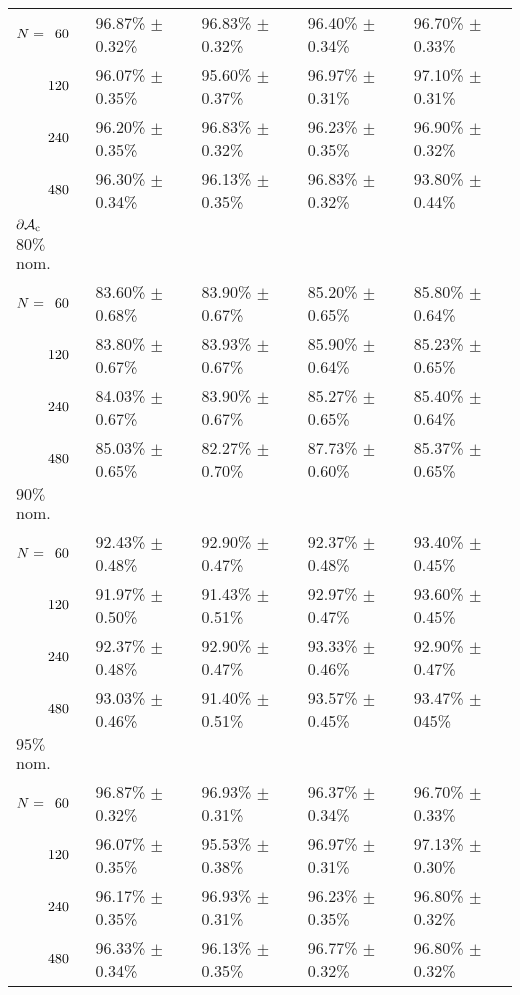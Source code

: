 \begin{table}[htbp]
\begin{tabular}{@{}p{}*{4}{L{\tabcolsep\relax}}@{}}
$N = \hphantom{1}60$ & 96.87\% $\pm$ 0.32\% & 96.83\% $\pm$ 0.32\% & 96.40\% $\pm$ 0.34\% & 96.70\% $\pm$ 0.33\% \\[-0.4em]
$\hphantom{N{}={}}120$ & 96.07\% $\pm$ 0.35\% & 95.60\% $\pm$ 0.37\% & 96.97\% $\pm$ 0.31\% & 97.10\% $\pm$ 0.31\% \\[-0.4em]
$\hphantom{N{}={}}240$ & 96.20\% $\pm$ 0.35\% & 96.83\% $\pm$ 0.32\% & 96.23\% $\pm$ 0.35\% & 96.90\% $\pm$ 0.32\% \\[-0.4em]
$\hphantom{N{}={}}480$ & 96.30\% $\pm$ 0.34\% & 96.13\% $\pm$ 0.35\% & 96.83\% $\pm$ 0.32\% & 93.80\% $\pm$ 0.44\%\\
\midrule
$\mathbf{\operatorname{\partial\mathcal{A}_{c}}}$\\[-0.4em]
$80\%$ nom.\\[-0.4em]
$N = \hphantom{1}60$ & 83.60\% $\pm$ 0.68\% & 83.90\% $\pm$ 0.67\% & 85.20\% $\pm$ 0.65\% & 85.80\% $\pm$ 0.64\% \\[-0.4em]
$\hphantom{N{}={}}120$ & 83.80\% $\pm$ 0.67\% & 83.93\% $\pm$ 0.67\% & 85.90\% $\pm$ 0.64\% & 85.23\% $\pm$ 0.65\%\\[-0.4em]
$\hphantom{N{}={}}240$ & 84.03\% $\pm$ 0.67\% & 83.90\% $\pm$ 0.67\% & 85.27\% $\pm$ 0.65\% & 85.40\% $\pm$ 0.64\% \\[-0.4em]
$\hphantom{N{}={}}480$ & 85.03\% $\pm$ 0.65\% & 82.27\% $\pm$ 0.70\% & 87.73\% $\pm$ 0.60\% & 85.37\% $\pm$ 0.65\%\\ 
$90\%$ nom.  \\[-0.4em]
$N = \hphantom{1}60$ & 92.43\% $\pm$ 0.48\% & 92.90\% $\pm$ 0.47\% & 92.37\% $\pm$ 0.48\% & 93.40\% $\pm$ 0.45\% \\[-0.4em]
$\hphantom{N{}={}}120$ & 91.97\% $\pm$ 0.50\% & 91.43\% $\pm$ 0.51\% & 92.97\% $\pm$ 0.47\% & 93.60\% $\pm$ 0.45\% \\[-0.4em]
$\hphantom{N{}={}}240$ & 92.37\% $\pm$ 0.48\% & 92.90\% $\pm$ 0.47\% & 93.33\% $\pm$ 0.46\% & 92.90\% $\pm$ 0.47\% \\[-0.4em]
$\hphantom{N{}={}}480$ & 93.03\% $\pm$ 0.46\% & 91.40\% $\pm$ 0.51\% & 93.57\% $\pm$ 0.45\% & 93.47\% $\pm$ 045\%\\ 
$95\%$ nom.  \\[-0.4em]
$N = \hphantom{1}60$ & 96.87\% $\pm$ 0.32\% & 96.93\% $\pm$ 0.31\% & 96.37\% $\pm$ 0.34\% & 96.70\% $\pm$ 0.33\% \\[-0.4em]
$\hphantom{N{}={}}120$ & 96.07\% $\pm$ 0.35\% & 95.53\% $\pm$ 0.38\% & 96.97\% $\pm$ 0.31\% & 97.13\% $\pm$ 0.30\% \\[-0.4em]
$\hphantom{N{}={}}240$ & 96.17\% $\pm$ 0.35\% & 96.93\% $\pm$ 0.31\% & 96.23\% $\pm$ 0.35\% & 96.80\% $\pm$ 0.32\% \\[-0.4em]
$\hphantom{N{}={}}480$ & 96.33\% $\pm$ 0.34\% & 96.13\% $\pm$ 0.35\% & 96.77\% $\pm$ 0.32\% & 96.80\% $\pm$ 0.32\% \\
\bottomrule
\end{tabular}
\label{tbl:supp_CI_3D_results}
\end{table}

